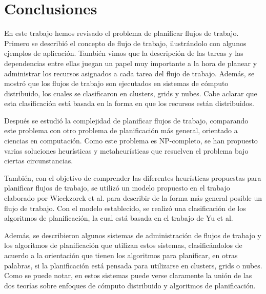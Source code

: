 \chapter{Conclusiones}


En este trabajo hemos revisado el problema de planificar flujos de trabajo. Primero se describió el concepto de flujo de trabajo, ilustrándolo con algunos ejemplos de aplicación. También vimos que la descripción de las tareas y las dependencias entre ellas juegan un papel muy importante a la hora de planear y administrar los recursos asignados a cada tarea del flujo de trabajo. Además, se mostró que los flujos de trabajo son ejecutados en sistemas de cómputo distribuido, los cuales se clasificaron en clusters, grids y nubes. Cabe aclarar que esta clasificación está basada en la forma en que los recursos están distribuidos.

Después se estudió la complejidad de planificar flujos de trabajo, comparando este problema con otro problema de planificación más general, orientado a ciencias en computación. Como este problema es NP-completo, se han propuesto varias soluciones heurísticas y metaheurísticas que resuelven el problema bajo ciertas circunstancias.

También, con el objetivo de comprender las diferentes heurísticas propuestas para planificar flujos de trabajo, se utilizó un modelo propuesto en el trabajo elaborado por Wieckzorek et al. para describir de la forma más general posible un flujo de trabajo. Con el modelo establecido, se realizó una clasificación de los algoritmos de planificación, la cual está basada en el trabajo de Yu et al.

Además, se describieron algunos sistemas de administración de flujos de trabajo y los algoritmos de planificación que utilizan estos sistemas, clasificándolos de acuerdo a la orientación que tienen los algoritmos para planificar, en otras palabras, si la planificación está pensada para utilizarse en clusters, grids o nubes. Como se puede notar, en estos sistemas puede verse claramente la unión de las dos teorías sobre enfoques de cómputo distribuido y algoritmos de planificación.


